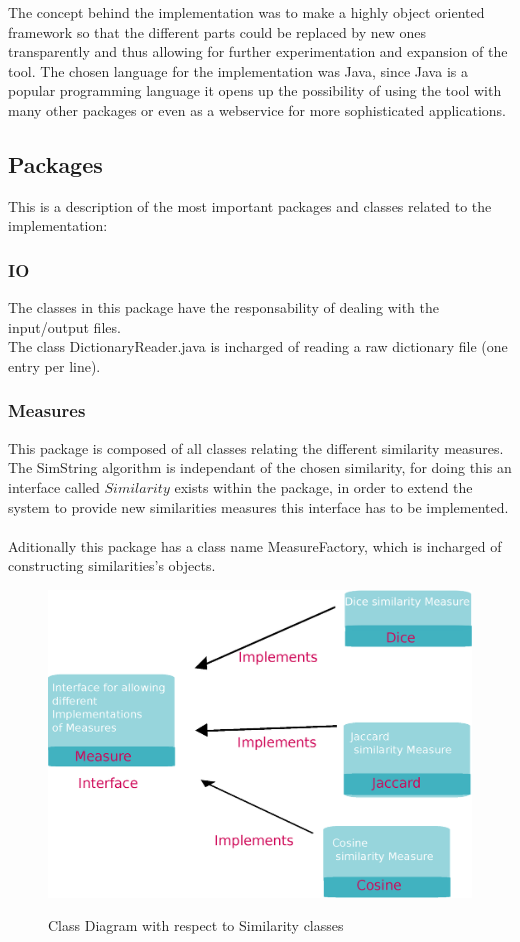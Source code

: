 The concept behind the implementation was to make a highly object oriented framework
so that the different parts could be replaced by new ones transparently and thus allowing
for further experimentation and expansion of the tool.
The chosen language for the implementation was Java, since Java is a popular programming language
it opens up the possibility of using the tool with many other packages or even as a webservice
for more sophisticated applications.

\subsection{Packages}

This is a description of the most important  packages and classes related to the implementation:


\subsubsection*{IO}
The classes in this package have the responsability of dealing with
the input/output files.\\
The class DictionaryReader.java is incharged of reading a raw dictionary file (one entry per line).

\subsubsection*{Measures}
This package is composed of all classes relating the different similarity measures.
The SimString algorithm is independant of the chosen similarity, for doing this
an interface called $Similarity$ exists within the package, in order to extend
the system to provide new similarities measures this interface has to be implemented.\\
\\
Aditionally this package has a class name MeasureFactory, which is incharged of constructing
similarities's objects.

\begin{figure}[h!]
  \caption{Class Diagram with respect to Similarity classes}
  \centering
    \includegraphics[scale=0.45]{graphics/similarities}
   \label{fig:similarityClasses}  
\end{figure}


